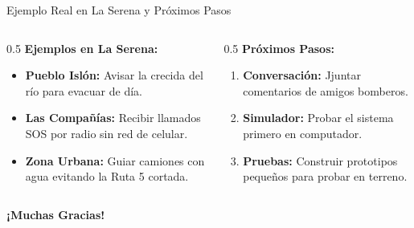 \documentclass[aspectratio=169]{beamer}
\begin{document}
\begin{frame}{Ejemplo Real en La Serena y Próximos Pasos}
  \begin{columns}
    \begin{column}{0.5\textwidth}
      \textbf{Ejemplos en La Serena:}
      \begin{itemize}
        \item \textbf{Pueblo Islón:} Avisar la crecida del río para evacuar de día.
        \item \textbf{Las Compañías:} Recibir llamados SOS por radio sin red de celular.
        \item \textbf{Zona Urbana:} Guiar camiones con agua evitando la Ruta 5 cortada.
      \end{itemize}
    \end{column}
    \begin{column}{0.5\textwidth}
      \textbf{Próximos Pasos:}
      \begin{enumerate}
        \item \textbf{Conversación:} Jjuntar comentarios de amigos bomberos.
        \item \textbf{Simulador:} Probar el sistema primero en computador.
        \item \textbf{Pruebas:} Construir prototipos pequeños para probar en terreno.
      \end{enumerate}
    \end{column}
  \end{columns}

  \vspace{0.5cm}
  \centering
  \textbf{\Large ¡Muchas Gracias!}
\end{frame}
\end{document}
